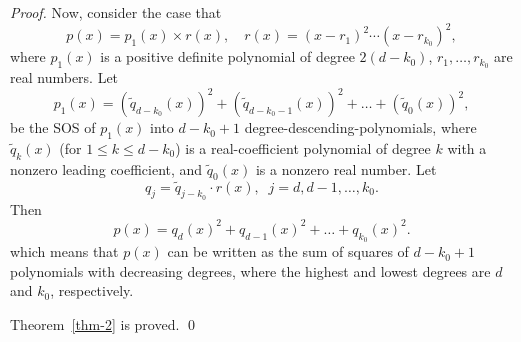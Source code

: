 \documentclass[10pt,a4paper]{amsart}
\begin{document}
\begin{proof}
Now, consider the case that 
$$
p(x)=p_1(x)\times r(x), \quad 
r(x)=(x-r_1)^2\cdots (x-r_{k_0})^2,
$$
where $p_1(x)$ is a positive definite polynomial of degree $2(d-k_0)$, $r_1,\ldots,r_{k_0}$ are real numbers.
Let
\[
p_1(x)=\left(\tilde{q}_{d-k_0}(x)\right)^2+\left(\tilde{q}_{d-k_0-1}(x)\right)^2+\ldots+\left(\tilde{q}_{0}(x)\right)^2,
\]
be the SOS of $p_1(x)$ into $d-k_0+1$ degree-descending-polynomials, 
where $\tilde{q}_{k}(x)$ (for $1\leq k\leq d-k_0$) is a real-coefficient polynomial of degree $k$ with a nonzero leading coefficient,  
and $\tilde{q}_{0}(x)$ is a nonzero real number. Let
$$
q_j=\tilde{q}_{j-k_0}\cdot r(x), \; \;
j=d,d-1,\ldots,k_0.
$$
Then
$$
p(x)=q_d(x)^2+q_{d-1}(x)^2+\ldots+
q_{k_0}(x)^2.
$$
which means that $p(x)$ can be written as the sum of squares of $d-k_0+1$ polynomials with decreasing degrees,  
where the highest and lowest degrees are $d$ and $k_0$, respectively.  

{Theorem~\ref{thm-2} is proved.}  
\qed  
    
\end{proof}  
\end{document}
